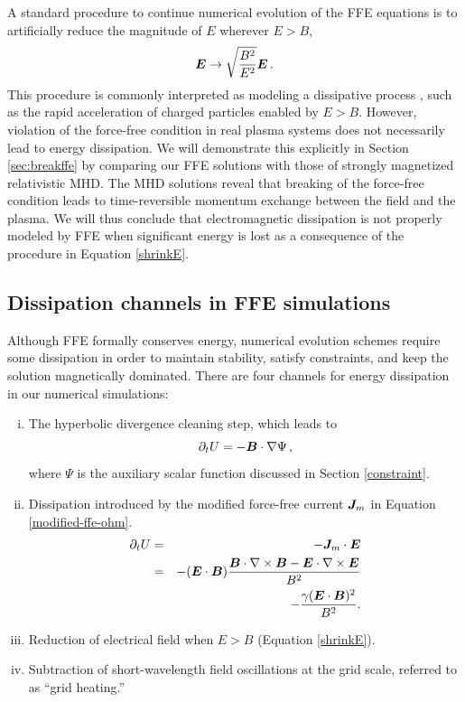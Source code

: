 A standard procedure to continue numerical evolution of the FFE equations is to artificially reduce the magnitude of $E$ wherever $E > B$,
%
\begin{equation}\label{shrinkE}
	\boldsymbol{E}\rightarrow\sqrt{\frac{B^2}{E^2}} \boldsymbol{E} \, .
\end{equation}
%
This procedure is commonly interpreted as modeling a dissipative process \citep{2006MNRAS.367.1797M, 2006ApJ...648L..51S}, such as the rapid acceleration of charged particles enabled by $E > B$. However, violation of the force-free condition in real plasma systems does not necessarily lead to energy dissipation. We will demonstrate this explicitly in Section \ref{sec:breakffe} by comparing our FFE solutions with those of strongly magnetized relativistic MHD. The MHD solutions reveal that breaking of the force-free condition leads to time-reversible momentum exchange between the field and the plasma. We will thus conclude that electromagnetic dissipation is not properly modeled by FFE when significant energy is lost as a consequence of the procedure in Equation \ref{shrinkE}.

\subsection{Dissipation channels in FFE simulations}
\label{dissipation-channels}
%
Although FFE formally conserves energy, numerical evolution schemes require some dissipation in order to maintain stability, satisfy constraints, and keep the solution magnetically dominated. There are four channels for energy dissipation in our numerical simulations:
%
\begin{enumerate}[(i)]
\item The hyperbolic divergence cleaning step, which leads to 
\begin{equation}
		\partial_t U = -\boldsymbol{B} \cdot \nabla \Psi \, ,
	\end{equation}
	where $\Psi$ is the auxiliary scalar function discussed in Section \ref{constraint}.
	\item Dissipation introduced by the modified force-free current $\boldsymbol{J}_m$ in Equation \ref{modified-ffe-ohm}.
	\begin{eqnarray}
	 \partial_t U &=& - \boldsymbol{J}_m \cdot\boldsymbol{E} \nonumber \\ 
	                   &=& -(\boldsymbol{E}\cdot\boldsymbol{B})\frac{\boldsymbol{B}\cdot\nabla\times \boldsymbol{B}-\boldsymbol{E}\cdot\nabla\times\boldsymbol{E}}{B^2} \nonumber \\
	                   &&-\frac{\gamma (\boldsymbol{E}\cdot\boldsymbol{B})^2}{B^2}.
	\end{eqnarray}
	\item Reduction of electrical field when $E>B$ (Equation \ref{shrinkE}).
	\item Subtraction of short-wavelength field oscillations at the grid scale, referred to as ``grid heating.''
\end{enumerate}
%


